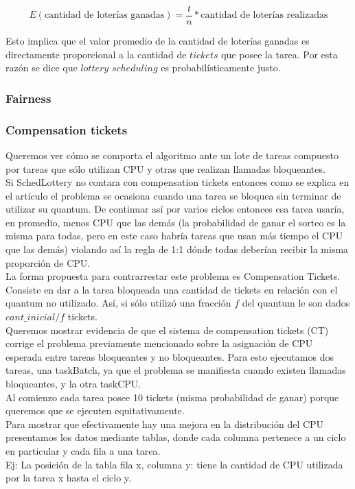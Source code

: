 \[
	E(\text{cantidad de loter\'ias ganadas}) = \frac{t}{n}*\text{cantidad de loter\'ias realizadas}
\]

Esto implica que el valor promedio de la cantidad de loter\'ias ganadas es directamente proporcional a la cantidad de $tickets$ que posee la tarea. Por esta raz\'on se dice que $lottery$ $scheduling$ es probabil\'isticamente justo.

\subsubsection{Fairness}

\subsubsection{Compensation tickets}

Queremos ver cómo se comporta el algoritmo ante un lote de tareas compuesto por
tareas que sólo utilizan CPU y otras que realizan llamadas bloqueantes.\\

Si SchedLottery no contara con compensation tickets entonces como se explica en el artículo \cite[Sec. 3.4]{SchedLottery} el problema se 
ocasiona cuando una tarea se bloquea sin terminar de utilizar su quantum.
De continuar así por varios ciclos entonces esa tarea usaría, en promedio, menos CPU que las demás
(la probabilidad de ganar el sorteo es la misma para todas, pero en este caso habría tareas que
usan más tiempo el CPU que las demás)
violando así la regla de 1:1 dónde todas deberían recibir la misma proporción de CPU.\\

La forma propuesta para contrarrestar este problema es Compensation Tickets. 
Consiste en dar a la tarea bloqueada una cantidad de tickets en relación con el quantum no utilizado.
Así, si sólo utilizó una fracción $f$ del quantum le son dados $cant\_inicial/f$ tickets.\\

Queremos mostrar evidencia de que el sistema de compensation tickets (CT) corrige el problema
previamente mencionado sobre la asignación de CPU esperada entre tareas bloqueantes y no bloqueantes.
Para esto ejecutamos dos tareas, una taskBatch, ya que el problema se manifiesta cuando existen llamadas bloqueantes, y la otra taskCPU.\\

Al comienzo cada tarea posee 10 tickets (misma probabilidad de ganar) porque queremos que se ejecuten equitativamente.\\
Para mostrar que efectivamente hay una mejora en la distribución del CPU presentamos los datos mediante tablas, donde cada columna pertenece a un ciclo en particular 
y cada fila a una tarea.\\
Ej: La posición de la tabla fila x, columna y: tiene la cantidad de CPU utilizada por la tarea x hasta el ciclo y.\\

